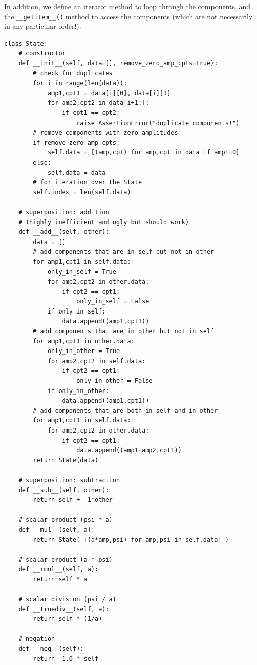 In addition, we define an iterator method to loop through the components, and the
\verb`__getitem__()` method to access the components (which are not necessarily
in any particular order!).

\begin{lstlisting}
class State:
    # constructor
    def __init__(self, data=[], remove_zero_amp_cpts=True):
        # check for duplicates
        for i in range(len(data)):
            amp1,cpt1 = data[i][0], data[i][1]
            for amp2,cpt2 in data[i+1:]:
                if cpt1 == cpt2:
                    raise AssertionError("duplicate components!")
        # remove components with zero amplitudes
        if remove_zero_amp_cpts:
            self.data = [(amp,cpt) for amp,cpt in data if amp!=0]
        else:
            self.data = data
        # for iteration over the State
        self.index = len(self.data)

    # superposition: addition
    # (highly inefficient and ugly but should work)
    def __add__(self, other):
        data = []
        # add components that are in self but not in other
        for amp1,cpt1 in self.data:
            only_in_self = True
            for amp2,cpt2 in other.data:
                if cpt2 == cpt1:
                    only_in_self = False
            if only_in_self:
                data.append((amp1,cpt1))
        # add components that are in other but not in self
        for amp1,cpt1 in other.data:
            only_in_other = True
            for amp2,cpt2 in self.data:
                if cpt2 == cpt1:
                    only_in_other = False
            if only_in_other:
                data.append((amp1,cpt1))
        # add components that are both in self and in other
        for amp1,cpt1 in self.data:
            for amp2,cpt2 in other.data:
                if cpt2 == cpt1:
                    data.append((amp1+amp2,cpt1))
        return State(data)
                
    # superposition: subtraction
    def __sub__(self, other):
        return self + -1*other

    # scalar product (psi * a)
    def __mul__(self, a):
        return State( [(a*amp,psi) for amp,psi in self.data] )

    # scalar product (a * psi)
    def __rmul__(self, a):
        return self * a
    
    # scalar division (psi / a)
    def __truediv__(self, a):
        return self * (1/a)
    
    # negation
    def __neg__(self):
        return -1.0 * self
    

\end{lstlisting}

